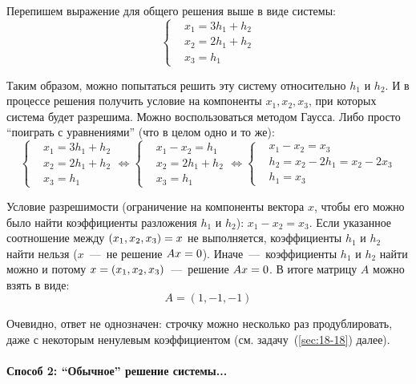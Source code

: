 \documentclass[a4paper,12pt]{article}
\begin{document}
\begin{solution}
    Перепишем выражение для общего решения выше в виде системы:
    \[
      \left\{
        \begin{aligned}
          &x_1 = 3h_1 + h_2\\
          &x_2 = 2h_1 + h_2\\
          &x_3 = h_1
        \end{aligned}
      \right.
    \]
    
    Таким образом, можно попытаться решить эту систему относительно $h_1$ и $h_2$.
    И в процессе решения получить условие на компоненты $x_1, x_2, x_3$, при которых система будет разрешима.
    Можно воспользоваться методом Гаусса.
    Либо просто ``поиграть с уравнениями'' (что в целом одно и то же):
    \[
      \left\{
        \begin{aligned}
          &x_1 = 3h_1 + h_2\\
          &x_2 = 2h_1 + h_2\\
          &x_3 = h_1
        \end{aligned}
      \right. \Leftrightarrow \left\{
        \begin{aligned}
          &x_1 - x_2 = h_1\\
          &x_2 = 2h_1 + h_2\\
          &x_3 = h_1
        \end{aligned}
      \right. \Leftrightarrow \left\{
        \begin{aligned}
          &x_1 - x_2 = x_3\\
          &h_2 = x_2 - 2h_1 = x_2 - 2x_3\\
          &h_1 = x_3
        \end{aligned}
      \right.
    \]
    
    Условие разрешимости (ограничение на компоненты вектора $x$, чтобы его можно было найти коэффициенты разложения $h_1$ и $h_2$): $\boxed{x_1 - x_2 = x_3}$.
    Если указанное соотношение между $(x_1, x_2, x_3) \hm= x$ не выполняется, коэффициенты $h_1$ и $h_2$ найти нельзя ($x$~---~не решение $Ax \hm= 0$).
    Иначе~---~коэффициенты $h_1$ и $h_2$ найти можно и потому $x \hm= (x_1, x_2, x_3)$~---~решение $Ax \hm= 0$.
    В итоге матрицу $A$ можно взять в виде:
    \[
      A = (1, -1, -1)
    \]

    Очевидно, ответ не однозначен: строчку можно несколько раз продублировать, даже с некоторым ненулевым коэффициентом (см. задачу~(\ref{sec:18-18}) далее).
    
    \bigskip
    
    \paragraph{Способ 2: ``Обычное'' решение системы...}
    

\end{solution}
\end{document}
